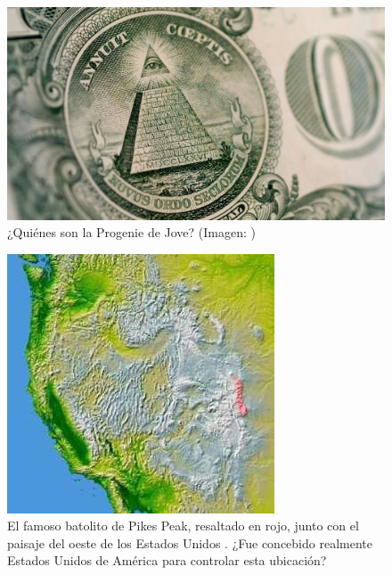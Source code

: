 \documentclass[10pt,twocolumn,letterpaper]{article}
\begin{document}
\begin{figure}[t]
\begin{center}
   \includegraphics[width=1\linewidth]{illuminati.jpg}
\end{center}
   \caption{¿Quiénes son la Progenie de Jove? (Imagen: \cite{35})}
\label{fig:10}
\label{fig:onecol}
\end{figure}

\begin{figure}[t]
\begin{center}
   \includegraphics[width=1\linewidth]{pike.jpg}
\end{center}
   \caption{El famoso batolito de Pikes Peak, resaltado en rojo, junto con el paisaje del oeste de los Estados Unidos \cite{36}. ¿Fue concebido realmente Estados Unidos de América para controlar esta ubicación?}
\label{fig:11}
\label{fig:onecol}
\end{figure}
\end{document}
